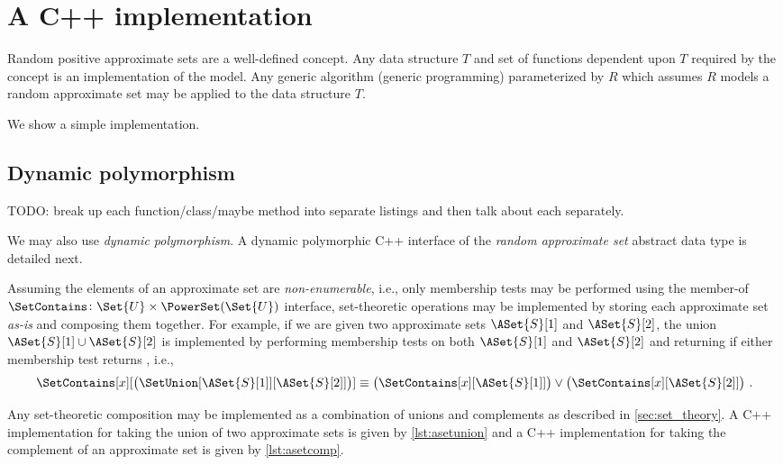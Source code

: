 \documentclass[ ../main.tex]{subfiles}
\begin{document}
\section{A C++ implementation}
\label{sec:impl}
Random positive approximate sets are a well-defined concept. Any data structure $T$ and set of functions dependent upon $T$ required by the concept is an implementation of the model.
Any generic algorithm (generic programming) parameterized by $R$ which assumes $R$ models a random approximate set may be applied to the data structure $T$.

We show a simple implementation.

\subsection{Dynamic polymorphism}
TODO: break up each function/class/maybe method into separate listings and then
talk about each separately.

We may also use \emph{dynamic polymorphism}. A dynamic polymorphic C++ 
interface of the \emph{random approximate set} abstract data type is detailed next.


Assuming the elements of an approximate set are \emph{non-enumerable}, i.e., only membership tests may be performed using the member-of $\SetContains \colon \Set{U} \times \PowerSet(\Set{U})$ interface, set-theoretic operations may be implemented by storing each approximate set \emph{as-is} and composing them together. For example, if we are given two approximate sets $\ASet{S}[1]$ and $\ASet{S}[2]$, the union $\ASet{S}[1] \cup \ASet{S}[2]$ is implemented by performing membership tests on both $\ASet{S}[1]$ and $\ASet{S}[2]$ and returning \True if either membership test returns \True, i.e.,
\begin{equation}
\SetContains[x][\left(\SetUnion[\ASet{S}[1]][\ASet{S}[2]]\right)] \equiv \left(\SetContains[x][\ASet{S}[1]]\right) \lor \left(\SetContains[x][\ASet{S}[2]]\right)\,.
\end{equation}

Any set-theoretic composition may be implemented as a combination of unions and complements as described in \cref{sec:set_theory}. A C++ implementation for taking the union of two approximate sets is given by \cref{lst:asetunion} and a C++ implementation for taking the complement of an approximate set is given by \cref{lst:asetcomp}.
\end{document}
